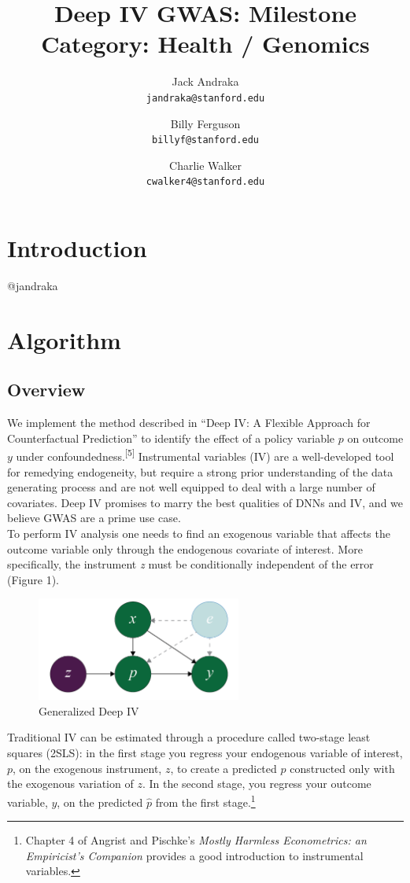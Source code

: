 \documentclass[11pt, oneside]{article}   	%
\title{Deep IV GWAS: Milestone \\
	\large Category: Health / Genomics}
\author{
	Jack Andraka\\ 
	\texttt{jandraka@stanford.edu}
	\and
	Billy Ferguson\\
	\texttt{billyf@stanford.edu}
	\and
	Charlie Walker\\
	\texttt{cwalker4@stanford.edu}
}
\date{}							%
\begin{document}
\maketitle
\section{Introduction}
@jandraka 

\section{Algorithm}
\subsection{Overview}
We implement the method described in ``Deep IV: A Flexible Approach for Counterfactual Prediction'' to identify the effect of a policy variable $p$ on outcome $y$ under confoundedness.\textsuperscript{[5]} Instrumental variables (IV) are a well-developed tool for remedying endogeneity, but require a strong prior understanding of the data generating process and are not well equipped to deal with a large number of covariates. Deep IV promises to marry the best qualities of DNNs and IV, and we believe GWAS are a prime use case. \\

To perform IV analysis one needs to find an exogenous variable that affects the outcome variable only through the endogenous covariate of interest. More specifically, the instrument \emph{z} must be conditionally independent of the error (Figure 1).\\

\begin{figure}[h]
	\caption{Generalized Deep IV}
	\centering
	\includegraphics[width=0.6\textwidth]{Figure_1.png}
\end{figure}

Traditional IV can be estimated through a procedure called two-stage least squares (2SLS): in the first stage you regress your endogenous variable of interest, $p$,  on the exogenous instrument, $z$, to create a predicted $\hat{p}$ constructed only with the exogenous variation of $z$. In the second stage, you regress your outcome variable, $y$, on the predicted $\hat{p}$ from the first stage.\footnote{Chapter 4 of Angrist and Pischke's \emph{Mostly Harmless Econometrics: an Empiricist's Companion} provides a good introduction to instrumental variables.}\\
\end{document}
